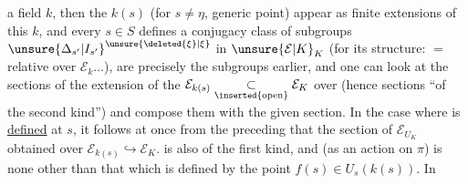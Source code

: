 a field $k$, then the $k(s)$ (for $s\ne\eta$, generic point) appear as finite extensions of this $k$, and every $s\in S$ defines a conjugacy class of subgroups $\unsure{\Delta_{s'}|I_{s'}}^{\unsure{\deleted{\xi}|\xi}}$ in $\unsure{\mathcal E|K}_K$ (for its structure:  $=$  relative over $\mathcal E_k\ldots$),   are precisely the subgroups      earlier, and one can look at the sections of the extension  of the $\mathcal E_{k(s)}\underset{\inserted{\text{open}}}{\subset}\mathcal E_K$ over (hence sections ``of the second kind'') and compose them with the given section. In the case where   is \uline{defined} at $s$, it follows at once from the preceding that the  section of $\mathcal E_{U_K}$ obtained over $\mathcal E_{k(s)}\hookrightarrow\mathcal E_K$. is also of the first kind, and  (as an  action  on $\pi$)  is none other than that which is defined by the point $f(s)\in U_s(k(s))$. In
